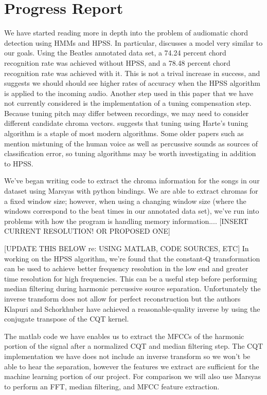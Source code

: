 \documentclass{article}
\begin{document}
\section{Progress Report}\label{sec:progreport}

We have started reading more in depth into the problem of audiomatic chord detection using
HMMs and HPSS. In particular, \cite{Ueda:19} discusses a model very similar to our goals. 
Using the Beatles annotated data set, a 74.24 percent chord recognition rate was 
achieved without HPSS, and a 78.48 percent chord recognition rate was achieved with it. This
is not a trival increase in success, and suggests we should should see higher rates of
accuracy when the HPSS algorithm is applied to the incoming audio. Another step used in this paper
that we have not currently considered is the implementation of a tuning compensation step. Because
tuning pitch may differ between recordings, we may need to consider different candidate chroma vectors.
\cite{McVicar:00} suggests that tuning using Harte's tuning algorithm is a staple of most modern algorithms.
Some older papers such as \cite{Zenz:20} mention mistuning of the human voice as well as percussive sounds as sources
of classification error, so tuning algorithms may be worth investigating in addition to HPSS.

We've began writing code to extract the chroma information for the songs in our dataset using Marsyas 
with python bindings. We are able to extract chromas for a fixed window size; however, when using a changing
window size (where the windows correspond to the beat times in our annotated data set), we've run into
problems with how the program is handling memory information.... [INSERT CURRENT RESOLUTION! OR PROPOSED ONE]

[UPDATE THIS BELOW re: USING MATLAB, CODE SOURCES, ETC]
In working on the HPSS algorithm, we're found that the constant-Q transformation can be used to achieve 
better frequency resolution in the low end and greater time resolution for high frequencies. This can be 
a useful step before performing median filtering during harmonic percussive source separation.
Unfortunately the inverse transform does not allow for perfect reconstruction but the 
authors Klapuri and Schorkhuber \cite{Schorkhuber:21} have achieved a reasonable-quality inverse by using the 
conjugate transpose of the CQT kernel.

The matlab code we have enables us to extract the MFCCs of the harmonic portion of the signal
after a normalized CQT and median filtering step. The CQT implementation we have does not include an inverse
transform so we won't be able to hear the separation, however the features we extract are sufficient for the machine learning 
portion of our project. For comparison we will also use Marsyas to perform an FFT, median filtering, and MFCC feature extraction.
\end{document}
